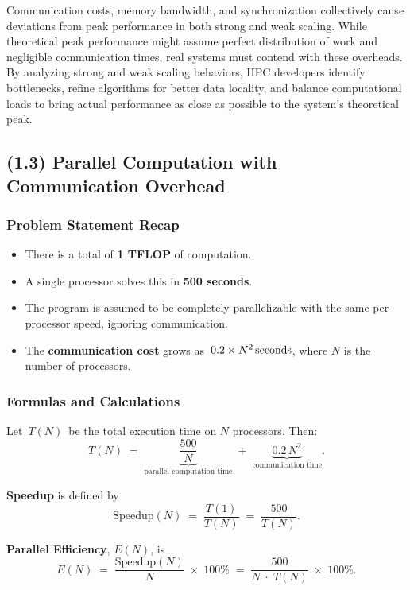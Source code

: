 \documentclass[11pt]{article}
\begin{document}
Communication costs, memory bandwidth, and synchronization collectively cause deviations from peak performance in both strong and weak scaling. While theoretical peak performance might assume perfect distribution of work and negligible communication times, real systems must contend with these overheads. By analyzing strong and weak scaling behaviors, HPC developers identify bottlenecks, refine algorithms for better data locality, and balance computational loads to bring actual performance as close as possible to the system’s theoretical peak.

\bigskip

\subsection*{(1.3) Parallel Computation with Communication Overhead}

\subsubsection*{Problem Statement Recap}
\begin{itemize}
\item There is a total of \textbf{1 TFLOP} of computation.  
\item A single processor solves this in \textbf{500 seconds}.  
\item The program is assumed to be completely parallelizable with the same per-processor speed, ignoring communication.  
\item The \textbf{communication cost} grows as \(\,0.2 \times N^2 \text{\,seconds}\), where \(N\) is the number of processors.
\end{itemize}

\subsubsection*{Formulas and Calculations}
Let \(\,T(N)\,\) be the total execution time on \(N\) processors. Then:
\[
T(N) \;=\; \underbrace{\frac{500}{N}}_{\text{parallel computation time}}
\;+\;
\underbrace{0.2\,N^2}_{\text{communication time}}.
\]

\noindent
\textbf{Speedup} is defined by
\[
\text{Speedup}(N) \;=\; \frac{T(1)}{T(N)} \;=\; \frac{500}{T(N)}.
\]

\noindent
\textbf{Parallel Efficiency}, \(E(N)\), is
\[
E(N) \;=\; \frac{\text{Speedup}(N)}{N}\;\times\; 100\% 
\;=\; \frac{500}{N\;\cdot\;T(N)}\;\times\; 100\%.
\]
\end{document}
